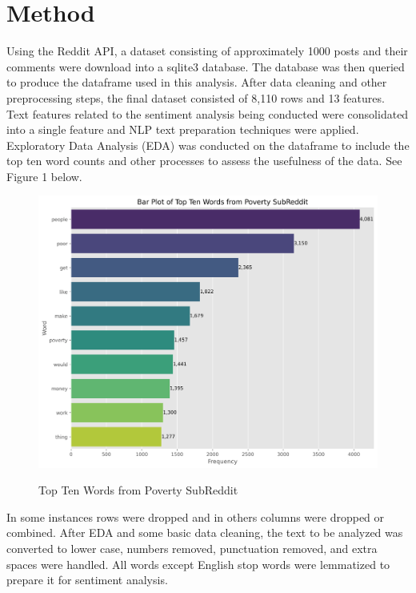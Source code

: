 \documentclass[stu,12pt,floatsintext]{apa7}
\begin{document}
\section{Method}
\indent Using the Reddit API, a dataset consisting of approximately 1000 posts and their comments were download into a sqlite3 database.  The database was then queried to produce the dataframe used in this analysis.  After data cleaning and other preprocessing steps, the final dataset consisted of 8,110 rows and 13 features.  Text features related to the sentiment analysis being conducted were consolidated into a single feature and NLP text preparation techniques were applied.  Exploratory Data Analysis (EDA) was conducted on the dataframe to include the top ten word counts and other processes to assess the usefulness of the data.  See Figure 1 below.
\begin{figure}[H]
	\centering
	\caption{Top Ten Words from Poverty SubReddit}
	\includegraphics[width=0.75\linewidth]{figures/barplotWordCount.png}
	\label{fig:word_counts}
\end{figure}
\indent In some instances rows were dropped and in others columns were dropped or combined.  After EDA and some basic data cleaning, the text to be analyzed  was converted to lower case, numbers removed, punctuation removed, and extra spaces were handled.  All words except English stop words were lemmatized to prepare it for sentiment analysis. 
\end{document}
